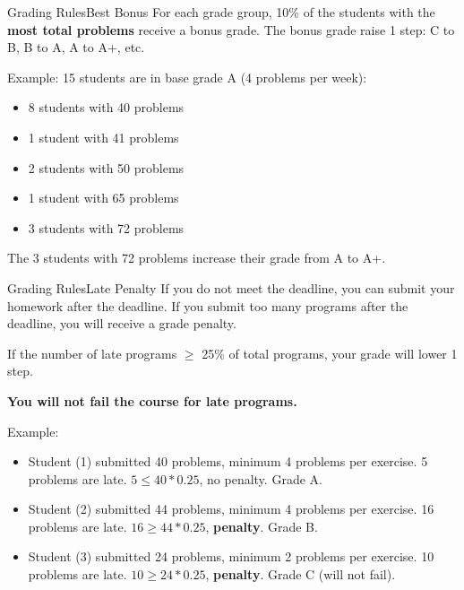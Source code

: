 \begin{frame}{Grading Rules}{Best Bonus}
  For each grade group, 10\% of the students with the {\bf most total problems}
  receive a bonus grade. The bonus grade raise 1 step: C to B, B to A, A to A+, etc.

  \begin{block}{Example:}
  15 students are in base grade A (4 problems per week):
  \begin{itemize}
    \item 8 students with 40 problems
    \item 1 student with 41 problems
    \item 2 students with 50 problems
    \item 1 student with 65 problems
    \item 3 students with 72 problems
  \end{itemize}\bigskip

  The 3 students with 72 problems increase their grade from A to A+.
  \end{block}
\end{frame}


\begin{frame}{Grading Rules}{Late Penalty}
  If you do not meet the deadline, you can submit your homework after the deadline.
  If you submit too many programs after the deadline, you will receive a grade penalty.\bigskip

  If the number of late programs $\ge$ 25\% of total programs, your grade will lower 1 step.\bigskip

  {\bf You will not fail the course for late programs.}

  \begin{exampleblock}{Example:}
    \begin{itemize}
      \item Student (1) submitted 40 problems, minimum 4 problems per exercise. 5 problems are late. $5 \le 40*0.25$, no penalty. Grade A.
      \item Student (2) submitted 44 problems, minimum 4 problems per exercise. 16 problems are late. $16 \ge 44*0.25$, {\bf penalty}. Grade B.
      \item Student (3) submitted 24 problems, minimum 2 problems per exercise. 10 problems are late. $10 \ge 24*0.25$, {\bf penalty}. Grade C (will not fail).
    \end{itemize}
  \end{exampleblock}
\end{frame}


